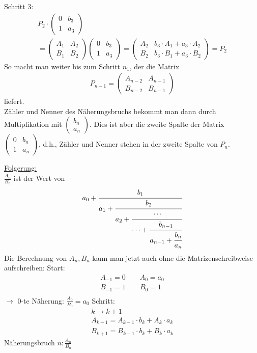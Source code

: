 Schritt 3:
\begin{align*}
P_2 \cdot	\begin{pmatrix}
				0& b_3\\
				1& a_3
			\end{pmatrix}\\
		=	\begin{pmatrix}
				A_1& A_2\\
				B_1& B_2
			\end{pmatrix}
			\begin{pmatrix}
				0& b_3\\
				1& a_3
			\end{pmatrix}
		=	\begin{pmatrix}
				A_2& b_3 \cdot A_1 + a_3 \cdot A_2\\
				B_2& b_3 \cdot B_1 + a_3 \cdot B_2
			\end{pmatrix}
		= 	P_2
\end{align*}
So macht man weiter bis zum Schritt $n_1$, der die Matrix
\begin{align*}
P_{n-1} = 	\begin{pmatrix}
				A_{n-2}& A_{n-1}\\
				B_{n-2}& B_{n-1}			
			\end{pmatrix}
\end{align*}
liefert.\\
Zähler und Nenner des Näherungsbruchs bekommt man dann durch Multiplikation mit $\begin{pmatrix}
b_n\\
a_n
\end{pmatrix}$. Dies ist aber die zweite Spalte der Matrix $\begin{pmatrix}
0& b_n\\
1& a_n
\end{pmatrix}$, d.h., Zähler und Nenner stehen in der zweite Spalte von $P_n$.

\underline{Folgerung:}\\

$\frac{A_n}{B_n}$ ist der Wert von
\begin{align*}
a_0 + \cfrac{b_1}{a_1+\cfrac{b_2}{a_2+\cfrac{\cdots}{\cdots+\cfrac{b_{n-1}}{a_{n-1} + \cfrac{b_n}{a_n}}}}}
\end{align*}
Die Berechnung von $A_n, B_n$ kann man jetzt auch ohne die Matrizenschreibweise aufschreiben:
Start:
\begin{align*}
A_{-1} = 0		\qquad		A_0 = a_0 \\
B_{-1} = 1		\qquad		B_0 = 1 \\
\end{align*}
$\rightarrow$ 0-te Näherung: $\frac{A_0}{B_0} = a_0$
Schritt:
\begin{align*}
k \rightarrow k + 1 \\
A_{k+1} = A_{k-1} \cdot b_k + A_k \cdot a_k \\
B_{k+1} = B_{k-1} \cdot b_k + B_k \cdot a_k
\end{align*}
Näherungsbruch $n: \frac{A_n}{B_n}$

